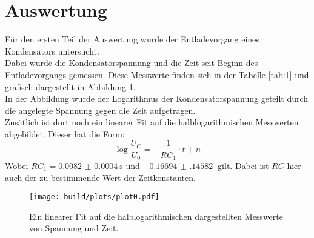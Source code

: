 \newpage
\section{Auswertung}
Für den ersten Teil der Auswertung wurde der Entladevorgang eines Kondensators untersucht.\\
Dabei wurde die Kondensatorspannung und die Zeit seit Beginn des Entladevorgangs gemessen.
Diese Messwerte finden sich in der Tabelle \ref{tab:1} und grafisch dargestellt in Abbildung \ref{img:1}.\\
In der Abbildung wurde der Logarithmus der Kondensatorspannung geteilt durch die angelegte Spannung gegen die Zeit aufgetragen.\\
Zusätlich ist dort noch ein linearer Fit auf die halblogarithmischen Messwerten abgebildet. Dieser hat die Form:
\begin{equation*}
    \log{\frac{U_C}{U_0}}= -\frac{1}{RC_1}\cdot t +n
\end{equation*}
Wobei $RC_1= \SI{0.0082(4)}{\second}$ und $\SI{-0.16694(14582)}{}$ gilt. Dabei ist $RC$ hier auch der zu bestimmende Wert der Zeitkonstanten.

\begin{figure}[h]
    \centering
    \texttt{[image: build/plots/plot0.pdf]}
    \caption{Ein linearer Fit auf die halblogarithmischen dargestellten Messwerte von Spannung und Zeit.}
    \label{img:1}
\end{figure}

